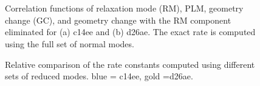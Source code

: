 \begin{figure}[!h]
\\
\\
\caption{Correlation functions of relaxation mode (RM), PLM, geometry change (GC), and geometry change with the RM component eliminated for (a) c14ee and (b) d26ae. The exact rate is computed using the full set of normal modes.}
\label{Corr}
\end{figure}


\begin{figure}[!h]
\caption{Relative comparison of the rate constants computed using different sets of reduced modes. blue = c14ee, gold =d26ae. }
\label{RateComp}
\end{figure}

